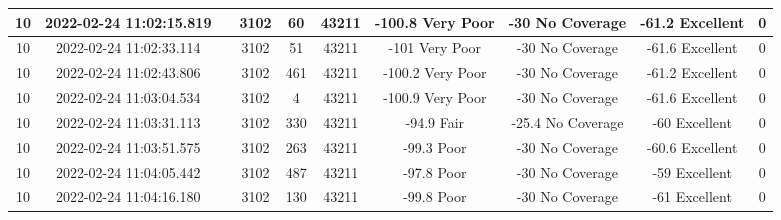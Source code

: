 \begin{longtable*}{|c|c|c|c|c|c|c|c|c|c|}
10&2022-02-24 11:02:15.819&&3102&60&43211& -100.8    Very Poor   & -30       No Coverage & -61.2     Excellent   & 0\\\hline
{}10&2022-02-24 11:02:33.114&&3102&51&43211& -101      Very Poor   & -30       No Coverage & -61.6     Excellent   & 0\\\hline
{}10&2022-02-24 11:02:43.806&&3102&461&43211& -100.2    Very Poor   & -30       No Coverage & -61.2     Excellent   & 0\\\hline
{}10&2022-02-24 11:03:04.534&&3102&4&43211& -100.9    Very Poor   & -30       No Coverage & -61.6     Excellent   & 0\\\hline
{}10&2022-02-24 11:03:31.113&&3102&330&43211& -94.9     Fair        & -25.4     No Coverage & -60       Excellent   & 0\\\hline
{}10&2022-02-24 11:03:51.575&&3102&263&43211& -99.3     Poor        & -30       No Coverage & -60.6     Excellent   & 0\\\hline
{}10&2022-02-24 11:04:05.442&&3102&487&43211& -97.8     Poor        & -30       No Coverage & -59       Excellent   & 0\\\hline
{}10&2022-02-24 11:04:16.180&&3102&130&43211& -99.8     Poor        & -30       No Coverage & -61       Excellent   & 0\\\hline

\end{longtable*}
